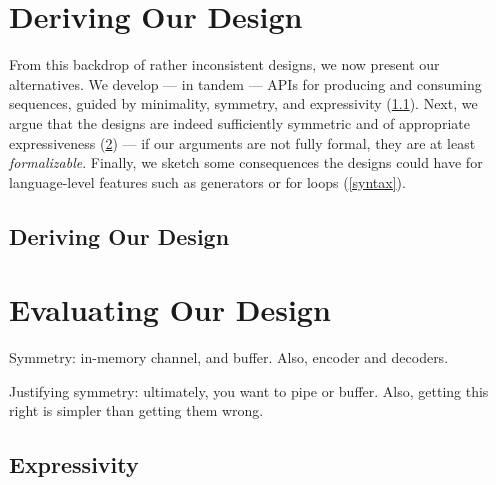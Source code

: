 \documentclass[sigplan,screen,10pt,anonymous,review]{acmart}
\begin{document}



\section{Deriving Our Design}\label{derivewwww}

From this backdrop of rather inconsistent designs, we now present our alternatives. We develop --- in tandem --- APIs for producing and consuming sequences, guided by minimality, symmetry, and expressivity (\cref{derive}). Next, we argue that the designs are indeed sufficiently symmetric and of appropriate expressiveness (\cref{evaluating_ours}) --- if our arguments are not fully formal, they are at least \textit{formalizable}. Finally, we sketch some consequences the designs could have for language-level features such as generators or for loops (\cref{syntax}).

\subsection{Deriving Our Design}\label{derive}

\section{Evaluating Our Design}\label{evaluating_ours}

Symmetry: in-memory channel, and buffer. Also, encoder and decoders.

Justifying symmetry: ultimately, you want to pipe or buffer. Also, getting this right is simpler than getting them wrong.

\subsection{Expressivity}\label{showing_expressivity}
\end{document}
